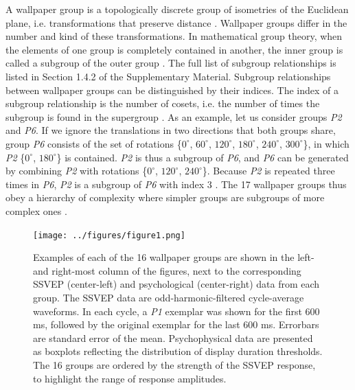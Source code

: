 \documentclass[9pt,twocolumn,twoside,lineno]{pnas-new}
\begin{document}
A wallpaper group is a topologically discrete group of isometries of the Euclidean plane, i.e. transformations that preserve distance \cite{RN1425}. Wallpaper groups differ in the number and kind of these transformations. In mathematical group theory, when the elements of one group is completely contained in another, the inner group is called a subgroup of the outer group \cite{RN1425}. The full list of subgroup relationships is listed in Section 1.4.2 of the Supplementary Material. Subgroup relationships between wallpaper groups can be distinguished by their indices. The index of a subgroup relationship is the number of cosets, i.e. the number of times the subgroup is found in the supergroup \cite{RN1425}. As an example, let us consider groups \textit{P2} and \textit{P6}. If we ignore the translations in two directions that both groups share, group \textit{P6} consists of the set of rotations \{$0^{\circ}$, $60^{\circ}$, $120^{\circ}$, $180^{\circ}$, $240^{\circ}$, $300^{\circ}$\}, in which \textit{P2} \{$0^{\circ}$, $180^{\circ}$\} is contained. \textit{P2} is thus a subgroup of \textit{P6}, and \textit{P6} can be generated by combining \textit{P2} with rotations \{$0^{\circ}$, $120^{\circ}$, $240^{\circ}$\}. Because \textit{P2} is repeated three times in \textit{P6}, \textit{P2} is a subgroup of \textit{P6} with index 3 \cite{RN1425}. The 17 wallpaper groups thus obey a hierarchy of complexity where simpler groups are subgroups of more complex ones \cite{RN1711}. 

\begin{figure}[h!tb]
\texttt{[image: ../figures/figure1.png]}
\caption{Examples of each of the 16 wallpaper groups are shown in the left- and right-most column of the figures, next to the corresponding SSVEP (center-left) and psychological (center-right) data from each group. The SSVEP data are odd-harmonic-filtered cycle-average waveforms. In each cycle, a \textit{P1} exemplar was shown for the first 600 ms, followed by the original exemplar for the last 600 ms. Errorbars are standard error of the mean. Psychophysical data are presented as boxplots reflecting the distribution of display duration thresholds. The 16 groups are ordered by the strength of the SSVEP response, to highlight the range of response amplitudes.}
\label{fig:example_stimuli}
\end{figure}
\end{document}
